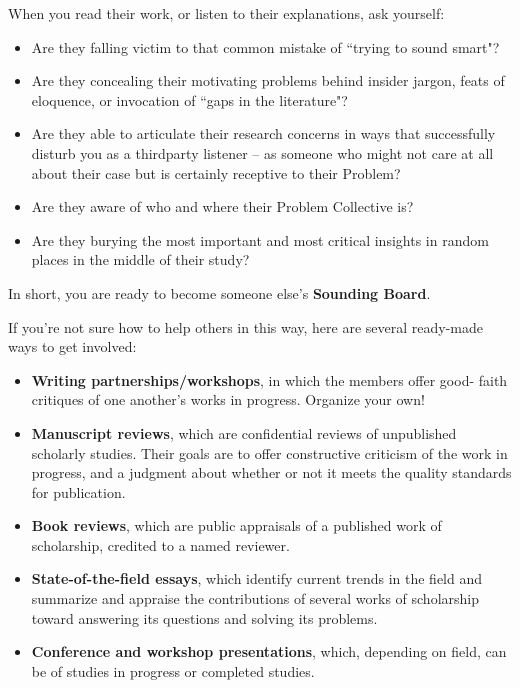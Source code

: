 \documentclass[11pt]{article}
\begin{document}
\begin{itemize}
\begin{exercise}
When you read their work, or listen to their explanations, ask yourself:
\begin{itemize}
\item Are they falling victim to that common mistake of ``trying to sound smart"?
\item Are they concealing their motivating problems behind insider jargon, feats of eloquence, or invocation of ``gaps in the literature"?
\item Are they able to articulate their research concerns in ways that successfully disturb you as a thirdparty listener -- as someone who might not care at all about their case but is certainly receptive to their Problem?
\item Are they aware of who and where their Problem Collective is?
\item Are they burying the most important and most critical insights in random places in the middle of their study?
\end{itemize}

In short, you are ready to become someone else’s \textbf{Sounding Board}. 

If you’re not sure how to help others in this way, here are several ready-made ways to get involved:
\begin{itemize}
\item \textbf{Writing partnerships/workshops}, in which the members offer good- faith critiques of one another’s works in progress. Organize your own!
\item \textbf{Manuscript reviews}, which are confidential reviews of unpublished scholarly studies. Their goals are to offer constructive criticism of the work in progress, and a judgment about whether or not it meets the quality standards for publication.
\item \textbf{Book reviews}, which are public appraisals of a published work of scholarship, credited to a named reviewer. 
\item \textbf{State-of-the-field essays}, which identify current trends in the field and summarize and appraise the contributions of several works of scholarship toward answering its questions and solving its problems.
\item \textbf{Conference and workshop presentations}, which, depending on field, can be of studies in progress or completed studies.  
\end{itemize}
\end{exercise}
\end{itemize}
\end{document}
